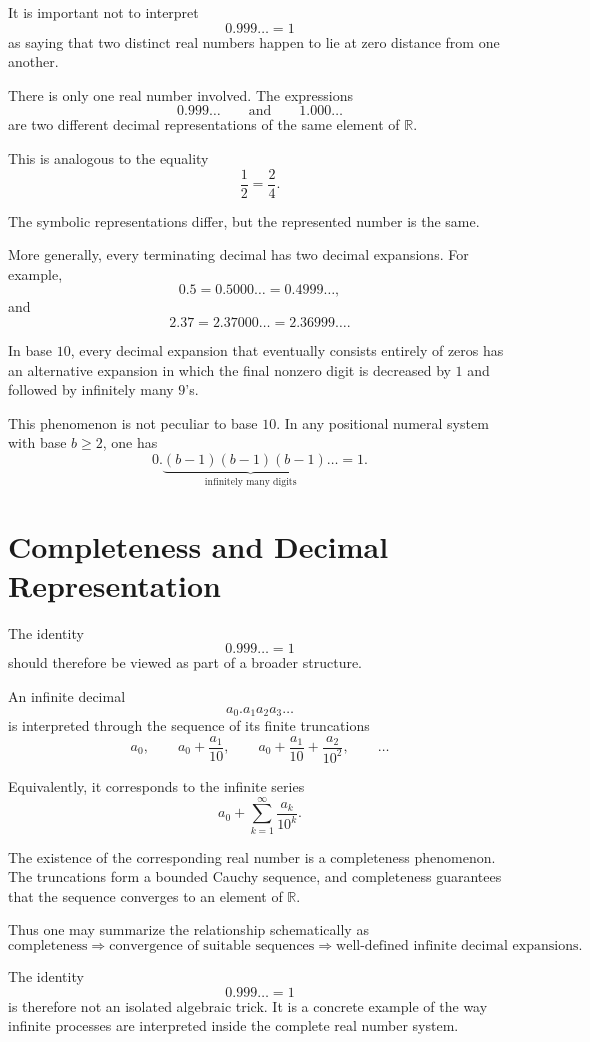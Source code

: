 \documentclass{essay}
\begin{document}
It is important not to interpret
\[
0.999\ldots=1
\]
as saying that two distinct real numbers happen to lie at zero distance from one another.

There is only one real number involved. The expressions
\[
0.999\ldots
\qquad\text{and}\qquad
1.000\ldots
\]
are two different decimal representations of the same element of \(\mathbb{R}\).

This is analogous to the equality
\[
\frac{1}{2}=\frac{2}{4}.
\]

The symbolic representations differ, but the represented number is the same.

More generally, every terminating decimal has two decimal expansions. For example,
\[
0.5=0.5000\ldots=0.4999\ldots,
\]
and
\[
2.37=2.37000\ldots=2.36999\ldots.
\]

In base \(10\), every decimal expansion that eventually consists entirely of zeros has an alternative expansion in which the final nonzero digit is decreased by \(1\) and followed by infinitely many \(9\)'s.

This phenomenon is not peculiar to base \(10\). In any positional numeral system with base \(b\geq2\), one has
\[
0.\underbrace{(b-1)(b-1)(b-1)\ldots}_{\text{infinitely many digits}}
=
1.
\]

\section{Completeness and Decimal Representation}

The identity
\[
0.999\ldots=1
\]
should therefore be viewed as part of a broader structure.

An infinite decimal
\[
a_0.a_1a_2a_3\ldots
\]
is interpreted through the sequence of its finite truncations
\[
a_0,\qquad
a_0+\frac{a_1}{10},\qquad
a_0+\frac{a_1}{10}+\frac{a_2}{10^2},\qquad
\ldots
\]

Equivalently, it corresponds to the infinite series
\[
a_0+\sum_{k=1}^{\infty}\frac{a_k}{10^k}.
\]

The existence of the corresponding real number is a completeness phenomenon. The truncations form a bounded Cauchy sequence, and completeness guarantees that the sequence converges to an element of \(\mathbb{R}\).

Thus one may summarize the relationship schematically as
\[
\text{completeness}
\Longrightarrow
\text{convergence of suitable sequences}
\Longrightarrow
\text{well-defined infinite decimal expansions}.
\]

The identity
\[
0.999\ldots=1
\]
is therefore not an isolated algebraic trick. It is a concrete example of the way infinite processes are interpreted inside the complete real number system.
\end{document}
